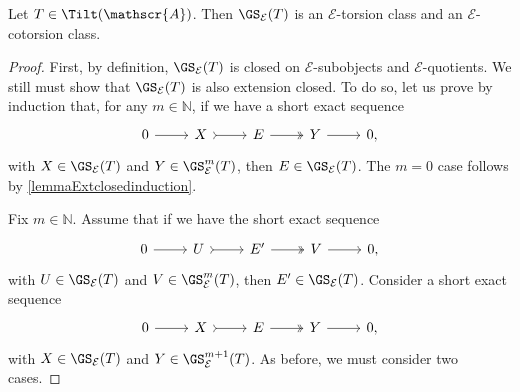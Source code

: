 \begin{prop}
\label{prop:Extclosed}
Let $T \in \Tilt(\mathscr{A})$. Then $\GS_{\mathcal{E}}(T)$ is an ${\mathcal{E}}$-torsion class and an ${\mathcal{E}}$-cotorsion class.
\end{prop}

\begin{proof}
First, by definition, $\GS_{\mathcal{E}}(T)$ is closed on ${\mathcal{E}}$-subobjects and ${\mathcal{E}}$-quotients. We still must show that $\GS_{\mathcal{E}}(T)$ is also extension closed. To do so, let us prove by induction that, for any $m \in \mathbb{N}$, if we have a short exact sequence
\[\begin{tikzcd}
	0 & X & E  & Y &  0,
	\arrow[from=1-1, to=1-2]
	\arrow[tail, from=1-2, to=1-3]
	\arrow[two heads,from=1-3, to=1-4]
	\arrow[from=1-4, to=1-5]
\end{tikzcd} \] with  $X\in \GS_{\mathcal{E}}(T)$ and $Y\in \GS^m_{\mathcal{E}} (T)$, then $E \in  \GS_{\mathcal{E}}(T)$. The $m=0$ case follows by \cref{lemmaExtclosedinduction}.

Fix $m \in \mathbb{N}$. Assume that if we have the short exact sequence 
\[\begin{tikzcd}
	0 & U & E' & V &  0,
	\arrow[from=1-1, to=1-2]
	\arrow[tail, from=1-2, to=1-3]
	\arrow[two heads,from=1-3, to=1-4]
	\arrow[from=1-4, to=1-5]
\end{tikzcd} \]
with $U \in \GS_{\mathcal{E}}(T)$ and $V \in \GS^{m}_{\mathcal{E}}(T)$, then $E' \in \GS_{\mathcal{E}}(T)$. Consider a short exact sequence \[\begin{tikzcd}
	0 & X & E  & Y &  0,
	\arrow[from=1-1, to=1-2]
	\arrow[tail, from=1-2, to=1-3]
	\arrow[two heads,from=1-3, to=1-4]
	\arrow[from=1-4, to=1-5]
\end{tikzcd} \] with $X \in \GS_\mathcal{E}(T)$ and $Y \in \GS_\mathcal{E}^{m+1}(T)$. As before, we must consider two cases.


\end{proof}
